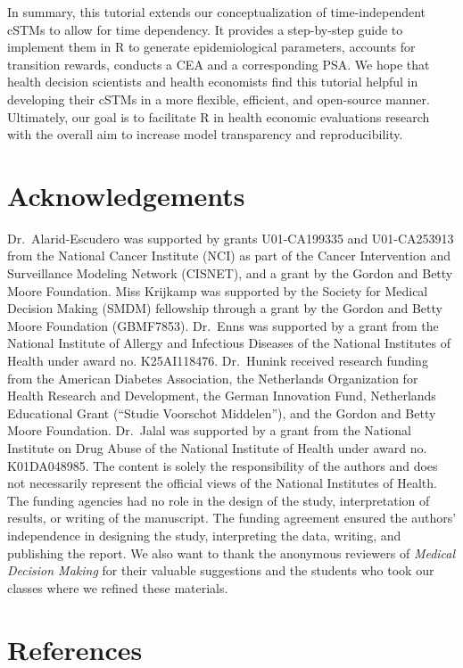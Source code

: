 \documentclass[
]{article}
\begin{document}
In summary, this tutorial extends our conceptualization of time-independent cSTMs to allow for time dependency. It provides a step-by-step guide to implement them in R to generate epidemiological parameters, accounts for transition rewards, conducts a CEA and a corresponding PSA. We hope that health decision scientists and health economists find this tutorial helpful in developing their cSTMs in a more flexible, efficient, and open-source manner. Ultimately, our goal is to facilitate R in health economic evaluations research with the overall aim to increase model transparency and reproducibility.

\hypertarget{acknowledgements}{%
\section{Acknowledgements}\label{acknowledgements}}

Dr.~Alarid-Escudero was supported by grants U01-CA199335 and U01-CA253913 from the National Cancer Institute (NCI) as part of the Cancer Intervention and Surveillance Modeling Network (CISNET), and a grant by the Gordon and Betty Moore Foundation. Miss Krijkamp was supported by the Society for Medical Decision Making (SMDM) fellowship through a grant by the Gordon and Betty Moore Foundation (GBMF7853). Dr.~Enns was supported by a grant from the National Institute of Allergy and Infectious Diseases of the National Institutes of Health under award no. K25AI118476. Dr.~Hunink received research funding from the American Diabetes Association, the Netherlands Organization for Health Research and Development, the German Innovation Fund, Netherlands Educational Grant (``Studie Voorschot Middelen''), and the Gordon and Betty Moore Foundation. Dr.~Jalal was supported by a grant from the National Institute on Drug Abuse of the National Institute of Health under award no. K01DA048985. The content is solely the responsibility of the authors and does not necessarily represent the official views of the National Institutes of Health. The funding agencies had no role in the design of the study, interpretation of results, or writing of the manuscript. The funding agreement ensured the authors' independence in designing the study, interpreting the data, writing, and publishing the report. We also want to thank the anonymous reviewers of \emph{Medical Decision Making} for their valuable suggestions and the students who took our classes where we refined these materials.

\hypertarget{references}{%
\section*{References}\label{references}}
\end{document}
